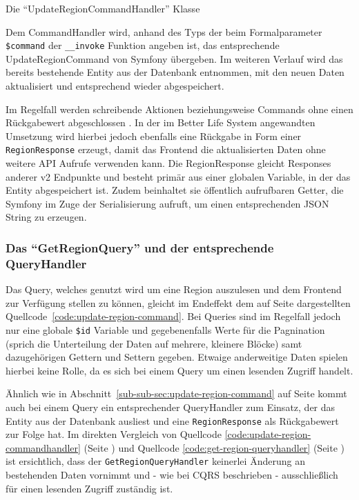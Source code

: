 \documentclass[a4paper,12pt,twoside]{scrreprt}
\begin{document}
\pagebreak

\begin{listing}[ht]
    \inputminted[fontsize=\footnotesize,linenos,breaklines]{php}{code/update_region_commandhandler.php}
    \caption[Die \enquote{UpdateRegionCommandHandler} Klasse]{Die \enquote{UpdateRegionCommandHandler} Klasse}
    \label{code:update-region-commandhandler}
\end{listing}

Dem CommandHandler wird, anhand des Typs der beim Formalparameter \texttt{\$command} der \texttt{\_\_invoke} Funktion angeben ist, das entsprechende UpdateRegionCommand von Symfony übergeben. Im weiteren Verlauf wird das bereits bestehende Entity aus der Datenbank entnommen, mit den neuen Daten aktualisiert und entsprechend wieder abgespeichert.

Im Regelfall werden schreibende Aktionen beziehungsweise Commands ohne einen Rückgabewert abgeschlossen \parencite[]{fowler_commandqueryseparation_2005}. In der im Better Life System angewandten Umsetzung wird hierbei jedoch ebenfalls eine Rückgabe in Form einer \texttt{RegionResponse} erzeugt, damit das Frontend die aktualisierten Daten ohne weitere API Aufrufe verwenden kann. Die RegionResponse gleicht Responses anderer v2 Endpunkte und besteht primär aus einer globalen Variable, in der das Entity abgespeichert ist. Zudem beinhaltet sie öffentlich aufrufbaren Getter, die Symfony im Zuge der Serialisierung aufruft, um einen entsprechenden JSON String zu erzeugen.

\subsubsection{Das \enquote{GetRegionQuery} und der entsprechende QueryHandler}
\label{sub-sub-sec:get-region-query}
Das Query, welches genutzt wird um eine Region auszulesen und dem Frontend zur Verfügung stellen zu können, gleicht im Endeffekt dem auf Seite \pageref{code:update-region-command} dargestellten Quellcode~\ref{code:update-region-command}. Bei Queries sind im Regelfall jedoch nur eine globale \texttt{\$id} Variable und gegebenenfalls Werte für die Pagnination (sprich die Unterteilung der Daten auf mehrere, kleinere Blöcke) samt dazugehörigen Gettern und Settern gegeben. Etwaige anderweitige Daten spielen hierbei keine Rolle, da es sich bei einem Query um einen lesenden Zugriff handelt.

\medskip

Ähnlich wie in Abschnitt~\ref{sub-sub-sec:update-region-command} auf Seite \pageref{sub-sub-sec:update-region-command} kommt auch bei einem Query ein entsprechender QueryHandler zum Einsatz, der das Entity aus der Datenbank ausliest und eine \texttt{RegionResponse} als Rückgabewert zur Folge hat. Im direkten Vergleich von Quellcode \ref{code:update-region-commandhandler} (Seite \pageref{code:update-region-commandhandler}) und Quellcode \ref{code:get-region-queryhandler} (Seite \pageref{code:get-region-queryhandler}) ist ersichtlich, dass der \texttt{GetRegionQueryHandler} keinerlei Änderung an bestehenden Daten vornimmt und - wie bei CQRS beschrieben - ausschließlich für einen lesenden Zugriff zuständig ist.
\end{document}
